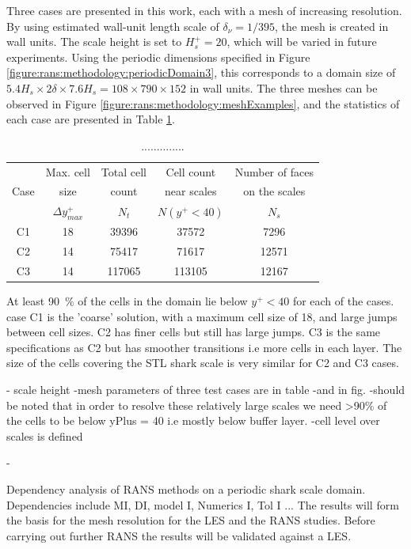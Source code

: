 \documentclass[12pt,oneside,a4paper]{article}
\begin{document}
Three cases are presented in this work, each with a mesh of increasing resolution. By using estimated wall-unit length scale of $\delta_\nu = 1/395$, the mesh is created in wall units. The scale height is set to $H_s^+ = 20$, which will be varied in future experiments. Using the periodic dimensions specified in Figure \ref{figure:rans:methodology:periodicDomain3}, this corresponds to a domain size of $ 5.4 H_s \times 2\delta  \times  7.6 H_s =  108 \times 790 \times 152$ in wall units. The three meshes can be observed in Figure \ref{figure:rans:methodology:meshExamples}, and the statistics of each case are presented in Table \ref{table:rans:meshStats}.
%
\begin{table}
\centering
\caption{..............}
\label{table:rans:meshStats}
\begin{tabular}{c c c c c}
\hline
	&  Max. cell	&	Total cell	&	Cell count	&	Number of faces \\
Case	&  size	&  count	&  near scales	&  on the scales	\\
		&	$\Delta y^+_{max}$	&	$N_t$	&	$N(y^+<40)$	&	$N_s$\\
\hline
C1	&	18	&	39396	&	37572	&	7296	\\
C2	&	14	&	75417	&	71617	&	12571	\\
C3	&	14	&	117065	&	113105	&	12167	\\
\hline
\end{tabular}
\end{table}
%
 At least \SI{90}{\%} of the cells in the domain lie below $y^+ < 40$ for each of the cases. case C1 is the 'coarse' solution, with a maximum cell size of 18, and large jumps between cell sizes. C2 has finer cells but still has large jumps. C3 is the same specifications as C2 but has smoother transitions i.e more cells in each layer. The size of the cells covering the STL shark scale is very similar for C2 and C3 cases. 
\newpage

- scale height
-mesh parameters of three test cases are in table
-and in fig.
-should be noted that in order to resolve these relatively large scales we need >90\% of the cells to be below yPlus = 40 i.e mostly below buffer layer. 
-cell level over scales is defined

-


 \newpage







\newpage

Dependency analysis of RANS methods on a periodic shark scale domain.
Dependencies include MI, DI, model I, Numerics I, Tol I ...
The results will form the basis for the mesh resolution for the LES and the RANS studies. Before carrying out further RANS the results will be validated against a LES. 
\end{document}
